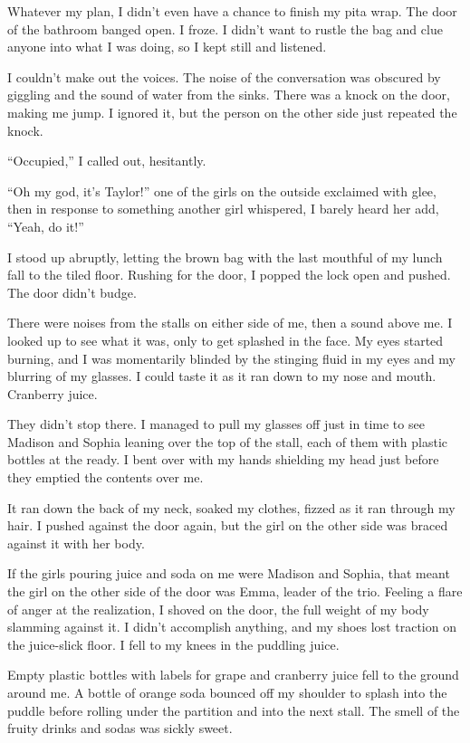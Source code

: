 Whatever my plan, I didn't even have a chance to finish my pita wrap. The door of the bathroom banged open. I froze. I didn't want to rustle the bag and clue anyone into what I was doing, so I kept still and listened.

I couldn't make out the voices. The noise of the conversation was obscured by giggling and the sound of water from the sinks. There was a knock on the door, making me jump. I ignored it, but the person on the other side just repeated the knock.

``Occupied,'' I called out, hesitantly.

``Oh my god, it's Taylor!'' one of the girls on the outside exclaimed with glee, then in response to something another girl whispered, I barely heard her add, ``Yeah, do it!''

I stood up abruptly, letting the brown bag with the last mouthful of my lunch fall to the tiled floor. Rushing for the door, I popped the lock open and pushed. The door didn't budge.

There were noises from the stalls on either side of me, then a sound above me. I looked up to see what it was, only to get splashed in the face. My eyes started burning, and I was momentarily blinded by the stinging fluid in my eyes and my blurring of my glasses. I could taste it as it ran down to my nose and mouth. Cranberry juice.

They didn't stop there. I managed to pull my glasses off just in time to see Madison and Sophia leaning over the top of the stall, each of them with plastic bottles at the ready. I bent over with my hands shielding my head just before they emptied the contents over me.

It ran down the back of my neck, soaked my clothes, fizzed as it ran through my hair. I pushed against the door again, but the girl on the other side was braced against it with her body.

If the girls pouring juice and soda on me were Madison and Sophia, that meant the girl on the other side of the door was Emma, leader of the trio. Feeling a flare of anger at the realization, I shoved on the door, the full weight of my body slamming against it. I didn't accomplish anything, and my shoes lost traction on the juice-slick floor. I fell to my knees in the puddling juice.

Empty plastic bottles with labels for grape and cranberry juice fell to the ground around me. A bottle of orange soda bounced off my shoulder to splash into the puddle before rolling under the partition and into the next stall. The smell of the fruity drinks and sodas was sickly sweet.

